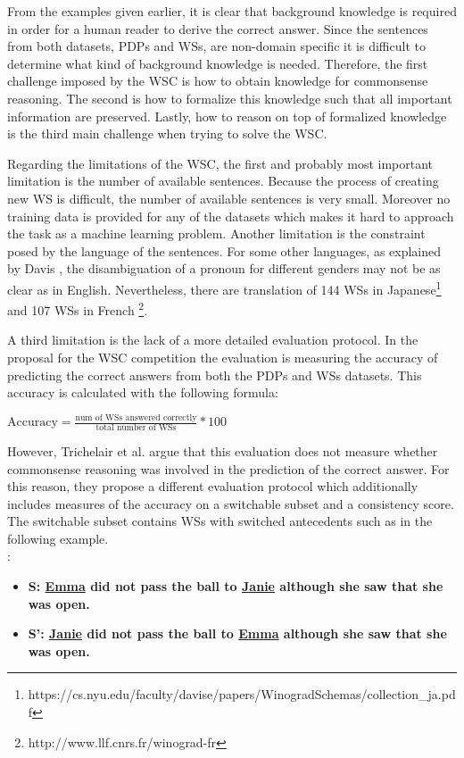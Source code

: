 From the examples given earlier, it is clear that background knowledge is required in order for a human reader to derive the correct answer. Since the sentences from both datasets, PDPs and WSs, are non-domain specific it is difficult to determine what kind of background knowledge is needed. Therefore, the first challenge imposed by the WSC is how to obtain knowledge for commonsense reasoning.
The second is how to formalize this knowledge such that all important information are preserved. Lastly, how to reason on top of formalized knowledge is the third main challenge when trying to solve the WSC.

Regarding the limitations of the WSC, the first and probably most important limitation is the number of available sentences. Because the process of creating new WS is difficult, the number of available sentences is very small. Moreover no training data is provided for any of the datasets which makes it hard to approach the task as a machine learning problem. Another limitation is the constraint posed by the language of the sentences. For some other languages, as explained by Davis \cite{DBLP:journals/corr/Davis16}, the disambiguation of a pronoun for different genders may not be as clear as in English. Nevertheless, there are translation of 144 WSs in Japanese\footnote{https://cs.nyu.edu/faculty/davise/papers/WinogradSchemas/collection\_ja.pdf} and 107 WSs in French \footnote{http://www.llf.cnrs.fr/winograd-fr}.

A third limitation is the lack of a more detailed evaluation protocol. In the proposal for the WSC competition the evaluation is measuring the accuracy of predicting the correct answers from both the PDPs and WSs datasets. This accuracy is calculated with the following formula: \\
\begin{center}
\begin{math}
	\text{Accuracy} = \frac{\text{num of WSs answered correctly}}{\text{total number of WSs}} * 100
\end{math}
\end{center}
However, Trichelair et al. \cite{DBLP:journals/corr/abs-1811-01778} argue that this evaluation does not measure whether commonsense reasoning was involved in the prediction of the correct answer. For this reason, they propose a different evaluation protocol which additionally includes measures of the accuracy on a switchable subset and a consistency score. The switchable subset contains WSs with switched antecedents such as in the following example. \\
:
\begin{itemize}
	\item \textbf{S: \underline{Emma} did not pass the ball to \underline{Janie} although she saw that she was open.}
	\item \textbf{S': \underline{Janie} did not pass the ball to \underline{Emma} although she saw that she was open.}
\end{itemize}


